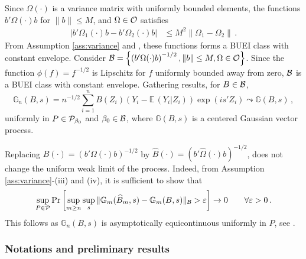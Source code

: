 \documentclass[12pt]{article}
\newcommand{\E}{\operatorname{E}}
\newcommand{\1}{\mathbf{1}}
\def\E{\mathbb{E}\,}
\begin{document}
Since $\Omega(\cdot)$ is a variance matrix with uniformly bounded
elements, the functions $b'\Omega(\cdot) b$ for $\|b\| \leq M$,
and $\Omega \in {\cal O}$ satisfies
\begin{align*}
\left| b' \Omega_{1}(\cdot) b  - b' \Omega_{2}(\cdot) b \right| &
\leq M^{2} \|\Omega_{1} - \Omega_{2}\|
\, .
\end{align*}
From Assumption \ref{ass:variance} and \citet[Lemma 9.13]{kosorok},
these functions forms a BUEI class with constant envelope. Consider ${\cal B} =
\left\{ \left( b'\Omega(\cdot) b\right)^{-1/2}, \|b\| \leq M, \Omega \in {\cal O}
\right\}$. Since the function $\phi (f) = f^{-1/2} $ is Lipschitz for
$f$ uniformly bounded away from zero, ${\cal B}$ is a BUEI class with
constant envelope.
Gathering  results, for $B \in {\cal B}$,
\begin{equation*}
\mathbb{G}_{n} (B,s) =
n^{-1/2} \sum_{i=1}^{n}{B (Z_{i}) \left( Y_{i} - \E(Y_{i}| Z_{i} )\right)
\exp(i s'Z_{i})}
\leadsto \mathbb{G} (B,s)
\, ,
\label{lem:eq3}
\end{equation*}
uniformly in $P \in {\cal P}_{\beta_0}$ and $\beta_0 \in {\cal B}$,
where $\mathbb{G} (B,s)$ is a centered Gaussian vector process.

Replacing
$B(\cdot) = \left( b' \Omega(\cdot) b \right)^{-1/2}$ by $\widehat{B}(\cdot) =
\left( b' \widehat{\Omega}(\cdot) b\right)^{-1/2}$, does
not change the uniform weak limit of the process.  Indeed, from Assumption
\ref{ass:variance}-(iii) and (iv), it is sufficient to show that
\begin{equation}
\sup_{P \in {\cal P}}
\Pr \left[  \sup_{m\geq n} \sup_{s} \| \mathbb{G}_{m} (\widehat{B}_{m},s) -
\mathbb{G}_{m} (B,s) \|_{\cal B}  > \varepsilon \right]
\rightarrow 0
\qquad \forall \varepsilon >0
\, .
\label{eq:asyequicont}
\end{equation}
This follows as $\mathbb{G}_{n}(B,s) $ is  asymptotically
equicontinuous uniformly in $P$, see \citet[Theorem
2.8.2]{vaart_weak_2000}.
\medskip

\subsubsection{Notations and preliminary results}
\end{document}
